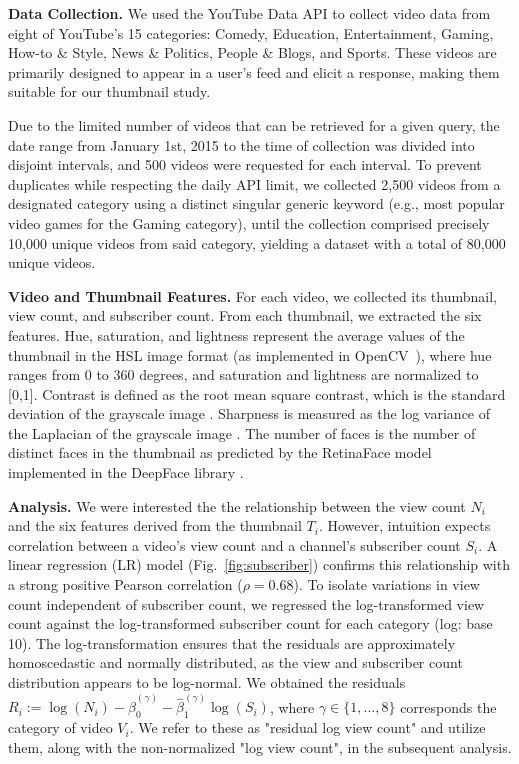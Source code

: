 \documentclass{article}
\begin{document}
\textbf{Data Collection.} We used the YouTube Data API \cite{youtubeapi} to collect video data from eight of YouTube's 15 categories: Comedy, Education, Entertainment, Gaming, How-to \& Style, News \& Politics, People \& Blogs, and Sports. These videos are primarily designed to appear in a user's feed and elicit a response, making them suitable for our thumbnail study.

Due to the limited number of videos that can be retrieved for a given query, the date range from January 1st, 2015 to the time of collection was divided into disjoint intervals, and 500 videos were requested for each interval. To prevent duplicates while respecting the daily API limit, we collected 2,500 videos from a designated category using a distinct singular generic keyword (e.g., most popular video games for the Gaming category), until the collection comprised precisely 10,000 unique videos from said category, yielding a dataset with a total of 80,000 unique videos.

\textbf{Video and Thumbnail Features.} For each video, we collected its thumbnail, view count, and subscriber count. From each thumbnail, we extracted the six features. Hue, saturation, and lightness represent the average values of the thumbnail in the HSL image format \cite{HSL} (as implemented in OpenCV~\cite{opencv_library}), where hue ranges from 0 to 360 degrees, and saturation and lightness are normalized to [0,1]. Contrast is defined as the root mean square contrast, which is the standard deviation of the grayscale image \cite{contrast}. Sharpness is measured as the log variance of the Laplacian of the grayscale image \cite{sharpness}. The number of faces is the number of distinct faces in the thumbnail as predicted by the RetinaFace model implemented in the DeepFace library \cite{serengil2024lightface,serengil2020lightface}.

\textbf{Analysis.} We were interested the the relationship between the view count $N_i$ and the six features derived from the thumbnail $T_i$. However, intuition expects correlation between a video's view count and a channel's subscriber count $S_i$. A linear regression (LR) model (Fig.~\ref{fig:subscriber}) confirms this relationship with a strong positive Pearson correlation ($\rho=0.68$). 
To isolate variations in view count independent of subscriber count, we regressed the log-transformed view count against the log-transformed subscriber count for each category (log: base 10). The log-transformation ensures that the residuals are approximately homoscedastic and normally distributed, as the view and subscriber count distribution appears to be log-normal. We obtained the residuals $R_{i} := \log(N_i) - \hat{\beta}_0^{(\gamma)} - \hat{\beta}_1^{(\gamma)} \log(S_i)$, where $\gamma \in \{1,..., 8\}$ corresponds the category of video $V_i$. We refer to these as "residual log view count" and utilize them, along with the non-normalized "log view count", in the subsequent analysis.
\end{document}
